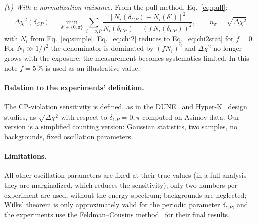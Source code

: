 \documentclass[11pt,a4paper]{article}
\begin{document}
\emph{(b) With a normalization nuisance.} From the pull method, Eq.~\eqref{eq:pull}:
\begin{equation}
  \boxed{\;\Delta\chi^2(\delta_{CP}) = \min_{\delta'\in\{0,\pi\}} \sum_{i=\nu,\bar\nu}
  \frac{\left[N_i(\delta_{CP}) - N_i(\delta')\right]^2}{N_i(\delta_{CP}) + \left(f\,N_i(\delta_{CP})\right)^2},
  \qquad n_\sigma = \sqrt{\Delta\chi^2}\;}
  \label{eq:chi2}
\end{equation}
with $N_i$ from Eq.~\eqref{eq:simple}. Eq.~\eqref{eq:chi2} reduces to Eq.~\eqref{eq:chi2stat} for $f=0$. For
$N_i\gg1/f^2$ the denominator is dominated by $(fN_i)^2$ and $\Delta\chi^2$ no longer grows with the exposure: the
measurement becomes systematics-limited. In this note $f=5\,\%$ is used as an illustrative value.

\paragraph{Relation to the experiments' definition.}
The CP-violation sensitivity is defined, as in the DUNE~\cite{DUNE:2020ypp} and Hyper-K~\cite{Hyper-Kamiokande:2018ofw}
design studies, as $\sqrt{\Delta\chi^2}$ with respect to $\delta_{CP} = 0, \pi$ computed on Asimov data. Our version is a
simplified counting version: Gaussian statistics, two samples, no backgrounds, fixed oscillation parameters.

\paragraph{Limitations.}
All other oscillation parameters are fixed at their true values (in a full analysis they are marginalized,
which reduces the sensitivity); only two numbers per experiment are used, without the energy spectrum;
backgrounds are neglected; Wilks' theorem is only approximately valid for the periodic parameter $\delta_{CP}$,
and the experiments use the Feldman--Cousins method~\cite{Feldman:1997qc} for their final results.
\end{document}
